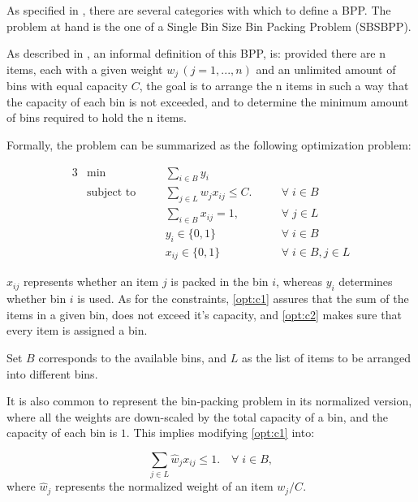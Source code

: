 As specified in \cite{wascher2007improved}, there are several categories with which to define a BPP. The problem at hand is the one of a Single Bin Size Bin Packing Problem (SBSBPP).

As described in \cite{delorme2016bin}, an informal definition of this BPP, is: provided there are n items, each with a given weight \( w_j  \, (j = 1, ..., n) \) and an unlimited amount of bins with equal capacity \( C \), the goal is to arrange the n items in such a way that the capacity of each bin is not exceeded, and to determine the minimum amount of bins required to hold the n items.

Formally, the problem can be summarized as the following optimization problem:

\begin{alignat}{3}
\label{BPP model}
    &\min &&\sum_{i \in B} y_i && \\
    &\text{subject to} \quad
                && \sum_{j \in L} w_j x_{ij} \leq C. \quad          && \forall \; i \in B \label{opt:c1}\\
    &           && \sum_{i \in B} x_{ij} = 1, \quad                 && \forall \; j \in L \label{opt:c2} \\
    &           && y_i \in \{0, 1\}                                 && \forall \; i \in B \\
    &           && x_{ij} \in \{0,1\}                               && \forall \; i \in B, j \in L
\end{alignat}

$x_{ij}$ represents whether an item $j$ is packed in the bin $i$, whereas $y_i$ determines whether bin $i$ is used. As for the constraints, \ref{opt:c1} assures that the sum of the items in a given bin, does not exceed it's capacity, and \ref{opt:c2} makes sure that every item is assigned a bin. 

Set $B$ corresponds to the available bins, and $L$ as the list of items to be arranged into different bins. 

It is also common to represent the bin-packing problem in its normalized version, where all the weights are down-scaled by the total capacity of a bin, and the capacity of each bin is $1$. This implies modifying \ref{opt:c1} into:

\begin{equation}
    \sum_{j \in L} \hat w_j x_{ij} \leq 1. \quad \forall \; i \in B,
\end{equation}
where \(\hat w_j\) represents the normalized weight of an item \( w_j/C \).

